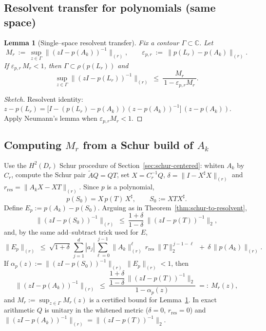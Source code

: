 \documentclass[11pt]{article}
\newtheorem{lemma}[definition]{Lemma}
\begin{document}
\subsection{Resolvent transfer for polynomials (same space)}
\begin{lemma}[Single–space resolvent transfer]\label{lem:resolvent-transfer-single}
Fix a contour \(\Gamma\subset\mathbb{C}\). Let
\[
M_r\ :=\ \sup_{z\in\Gamma}\|(zI-p(A_k))^{-1}\|_{(r)},
\qquad
\varepsilon_{p,r}\ :=\ \|p(L_r)-p(A_k)\|_{(r)}.
\]
If \(\varepsilon_{p,r}\,M_r<1\), then \(\Gamma\subset\rho(p(L_r))\) and
\[
\sup_{z\in\Gamma}\|(zI-p(L_r))^{-1}\|_{(r)}
\ \le\ \frac{M_r}{\,1-\varepsilon_{p,r} M_r\,}.
\]
\end{lemma}

\begin{proof}[Sketch]
Resolvent identity:
\(z-p(L_r)=\big[I-(p(L_r)-p(A_k))(z-p(A_k))^{-1}\big]\,(z-p(A_k))\).
Apply Neumann’s lemma when \(\varepsilon_{p,r}M_r<1\).
\end{proof}

\subsection{Computing \texorpdfstring{$M_r$}{Mr} from a Schur build of \texorpdfstring{$A_k$}{Ak}}
Use the \(H^2(D_r)\) Schur procedure of Section~\ref{sec:schur-centered}:
whiten \(A_k\) by \(C_r\), compute the Schur pair \(\widetilde A Q=QT\), set \(X=C_r^{-1}Q\),
\(\delta=\|I-X^\sharp X\|_{(r)}\) and \(r_{\mathrm{res}}=\|A_kX-XT\|_{(r)}\).
Since \(p\) is a polynomial,
\[
p(S_0)=X\,p(T)\,X^\sharp,\qquad S_0:=XTX^\sharp.
\]
Define \(E_p:=p(A_k)-p(S_0)\). Arguing as in Theorem~\ref{thm:schur-to-resolvent},
\[
\|(zI-p(S_0))^{-1}\|_{(r)}\ \le\ \frac{1+\delta}{1-\delta}\ \|(zI-p(T))^{-1}\|_2,
\]
and, by the same add–subtract trick used for \(E\),
\begin{equation}\label{eq:poly-sim-defect}
\|E_p\|_{(r)}\ \le\ \sqrt{1+\delta}\,\sum_{j=1}^d |a_j|
\sum_{\ell=0}^{j-1} \|A_k\|_{(r)}^{\ell}\, r_{\mathrm{res}}\ \|T\|_2^{\,j-1-\ell}
\ +\ \delta\,\|p(A_k)\|_{(r)}.
\end{equation}
If \(\alpha_p(z):=\|(zI-p(S_0))^{-1}\|_{(r)}\,\|E_p\|_{(r)}<1\), then
\[
\boxed{\quad
\|(zI-p(A_k))^{-1}\|_{(r)}
\ \le\ \frac{\dfrac{1+\delta}{1-\delta}\,\|(zI-p(T))^{-1}\|_2}{1-\alpha_p(z)}\ =:\ M_r(z),
\quad}
\]
and \(M_r:=\sup_{z\in\Gamma}M_r(z)\) is a certified bound for Lemma~\ref{lem:resolvent-transfer-single}.
In exact arithmetic \(Q\) is unitary in the whitened metric (\(\delta=0\), \(r_{\mathrm{res}}=0\)) and
\(\|(zI-p(A_k))^{-1}\|_{(r)}=\|(zI-p(T))^{-1}\|_2\).
\end{document}
